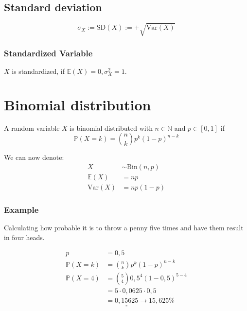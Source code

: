 \documentclass[twoside, a4paper, twocolumn]{article}
\begin{document}
    \subsection{Standard deviation}

    \begin{equation}
        \sigma_X := \textrm{SD}(X) := +\sqrt{\textrm{Var}(X)}
    \end{equation}

    \subsubsection{Standardized Variable}

    $X$ is standardized, if $\mathbb{E}(X) = 0, \sigma_X^2 = 1$.
    \section{Binomial distribution}

    A random variable $X$ is binomial distributed with $n \in \mathbb{N}$ and
    $p \in [0,1]$ if
    \begin{equation}
        \mathbb{P}(X = k) = \binom{n}{k}p^k(1-p)^{n-k}
    \end{equation}

    We can now denote:
    \begin{align}
        X &\sim \textrm{Bin}(n,p) \\
        \mathbb{E}(X) &= np \\
        \textrm{Var}(X) &= np(1-p)
    \end{align}

    \subsubsection{Example}
    Calculating how probable it is to throw a penny five times and have them
    result in four heads.

    \begin{align*}
        p &= 0,5 \\
        \mathbb{P}(X = k) &= \binom{n}{k}p^k(1-p)^{n-k} \\
        \mathbb{P}(X = 4) &= \binom{5}{4}0,5^4(1-0,5)^{5-4} \\
                          &= 5 \cdot 0,0625 \cdot 0,5 \\
                          &= \underline{\underline{0,15625}} \rightarrow 15,625\%
    \end{align*}
\end{document}
